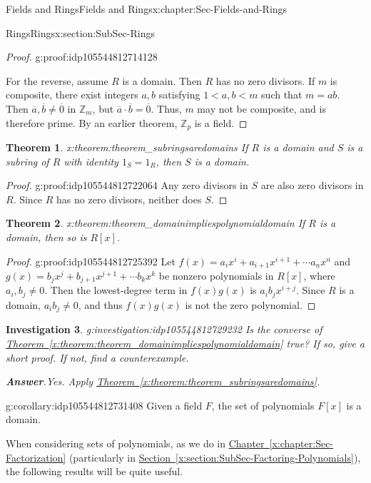 \documentclass[oneside,10pt,]{book}
\newcommand{\blocktitlefont}{\relax}
\newcommand{\xreffont}{\relax}
\numberwithin{equation}{section}
\def\Z{{\mathbb Z}}
\newtheorem{theorem}{Theorem}[section]
\newtheorem{investigation}[theorem]{Investigation}
\newcommand{\lt}{<}
\begin{document}
\begin{chapterptx}{Fields and Rings}{}{Fields and Rings}{}{}{x:chapter:Sec-Fields-and-Rings}
\begin{sectionptx}{Rings}{}{Rings}{}{}{x:section:SubSec-Rings}
\begin{proof}{}{g:proof:idp105544812714128}
\par
For the reverse, assume \(R\) is a domain. Then \(R\) has no zero divisors. If \(m\) is composite, there exist integers \(a,b\) satisfying \(1 \lt a,b \lt m\) such that \(m=ab\). Then \(\overline{a},\overline{b}\ne \overline{0}\) in \(\Z_m\), but \(\overline{a}\cdot \overline{b} = \overline{0}\). Thus, \(m\) may not be composite, and is therefore prime. By an earlier theorem, \(\Z_p\) is a field.%
\end{proof}
\begin{theorem}{}{}{x:theorem:theorem_subringsaredomains}%
If \(R\) is a domain and \(S\) is a subring of \(R\) with identity \(1_S = 1_R\), then \(S\) is a domain.%
\end{theorem}
\begin{proof}{}{g:proof:idp105544812722064}
Any zero divisors in \(S\) are also zero divisors in \(R\). Since \(R\) has no zero divisors, neither does \(S\).%
\end{proof}
\begin{theorem}{}{}{x:theorem:theorem_domainimpliespolynomialdomain}%
If \(R\) is a domain, then so is \(R[x]\).%
\end{theorem}
\begin{proof}{}{g:proof:idp105544812725392}
Let \(f(x) = a_i x^i + a_{i+1} x^{i+1} + \cdots a_n x^n\) and \(g(x) = b_j x^j + b_{j+1} x^{j+1} + \cdots b_k x^k\) be nonzero polynomials in \(R[x]\), where \(a_i, b_j \ne 0\). Then the lowest-degree term in \(f(x) g(x)\) is \(a_i b_j x^{i+j}\). Since \(R\) is a domain, \(a_i b_j\ne 0\), and thus \(f(x)g(x)\) is not the zero polynomial.%
\end{proof}
\begin{investigation}{}{g:investigation:idp105544812729232}%
Is the converse of \hyperref[x:theorem:theorem_domainimpliespolynomialdomain]{Theorem~{\xreffont\ref{x:theorem:theorem_domainimpliespolynomialdomain}}} true? If so, give a short proof. If not, find a counterexample.%
\par\smallskip%
\noindent\textbf{\blocktitlefont Answer}.\hypertarget{g:answer:idp105544812730512}{}\quad{}Yes. Apply \hyperref[x:theorem:theorem_subringsaredomains]{Theorem~{\xreffont\ref{x:theorem:theorem_subringsaredomains}}}.%
\end{investigation}%
\begin{corollary}{}{}{g:corollary:idp105544812731408}%
Given a field \(F\), the set of polynomials \(F[x]\) is a domain.%
\end{corollary}
When considering sets of polynomials, as we do in \hyperref[x:chapter:Sec-Factorization]{Chapter~{\xreffont\ref{x:chapter:Sec-Factorization}}} (particularly in \hyperref[x:section:SubSec-Factoring-Polynomials]{Section~{\xreffont\ref{x:section:SubSec-Factoring-Polynomials}}}), the following results will be quite useful.%

\end{sectionptx}
\end{chapterptx}
\end{document}
